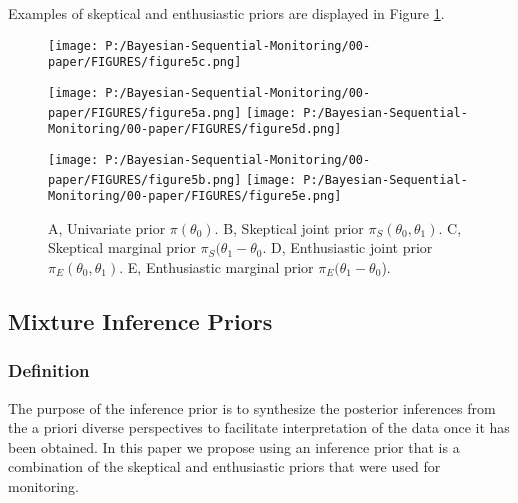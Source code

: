 \documentclass[12pt]{article}
\begin{document}
Examples of skeptical and enthusiastic priors are displayed in Figure \ref{fig:figure5}.

\begin{figure}\begin{center}
\texttt{[image: P:/Bayesian-Sequential-Monitoring/00-paper/FIGURES/figure5c.png]}

\texttt{[image: P:/Bayesian-Sequential-Monitoring/00-paper/FIGURES/figure5a.png]}
\texttt{[image: P:/Bayesian-Sequential-Monitoring/00-paper/FIGURES/figure5d.png]}

\texttt{[image: P:/Bayesian-Sequential-Monitoring/00-paper/FIGURES/figure5b.png]}
\texttt{[image: P:/Bayesian-Sequential-Monitoring/00-paper/FIGURES/figure5e.png]}
\caption{A, Univariate prior $\pi(\theta_0)$. B, Skeptical joint prior $\pi_S(\theta_0,\theta_1)$. C, Skeptical marginal prior $\pi_S(\theta_1-\theta_0$. D, Enthusiastic joint prior $\pi_E(\theta_0,\theta_1)$. E, Enthusiastic marginal prior $\pi_E(\theta_1-\theta_0$).}
\label{fig:figure5}
 \end{center}\end{figure}
\subsection{Mixture Inference Priors}
\subsubsection{Definition}
The purpose of the inference prior is to synthesize the posterior inferences from the a priori diverse perspectives to facilitate interpretation of the data once it has been obtained. In this paper we propose using an inference prior that is a combination of the skeptical and enthusiastic priors that were used for monitoring.
\end{document}
